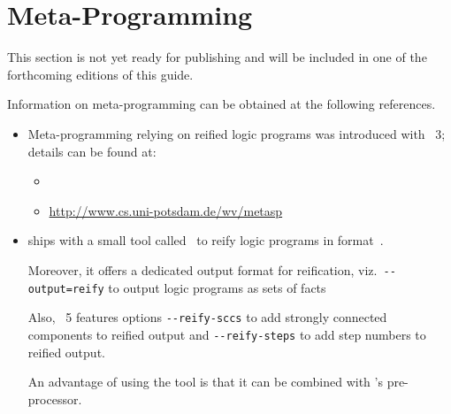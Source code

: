\section{Meta-Programming}\label{sec:meta}

This section is not yet ready for publishing
and will be included in one of the forthcoming editions of this guide.

Information on meta-programming can be obtained at the following references.

\begin{itemize}
\item Meta-programming relying on reified logic programs was introduced with \gringo~3;
  details can be found at:
  \begin{itemize}
  \item \cite{gekasc11b}
  \item \url{http://www.cs.uni-potsdam.de/wv/metasp}
  \end{itemize}

\item \gringo{} ships with a small tool called \reify\ to reify logic programs in \aspif{} format~\cite{kascwa17a}.

  Moreover, it offers a dedicated output format for reification, viz.\
  \lstinline{--output=reify}
  to output logic programs as sets of facts

  Also, \gringo~5 features options
  \lstinline{--reify-sccs}
  to add strongly connected components to reified output
  and
  \lstinline{--reify-steps}
  to add step numbers to reified output.

  An advantage of using the \reify{} tool is that it can be combined with \clasp's pre-processor.
\end{itemize}

% 


